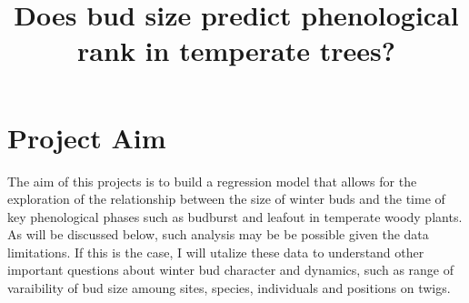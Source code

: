 \documentclass{article}\usepackage[]{graphicx}\usepackage[]{color}
\begin{document}
\title{Does bud size predict phenological rank in temperate trees?}
\section*{Project Aim}
\par The aim of this projects is to build a regression model that allows for the exploration of the relationship between the size of winter buds and the time of key phenological phases such as budburst and leafout in temperate woody plants. As will be discussed below, such analysis may be be possible given the data limitations. If this is the case, I will utalize these data to understand other important questions about winter bud character and dynamics, such as range of varaibility of bud size amoung sites, species, individuals and positions on twigs.\par
\end{document}
